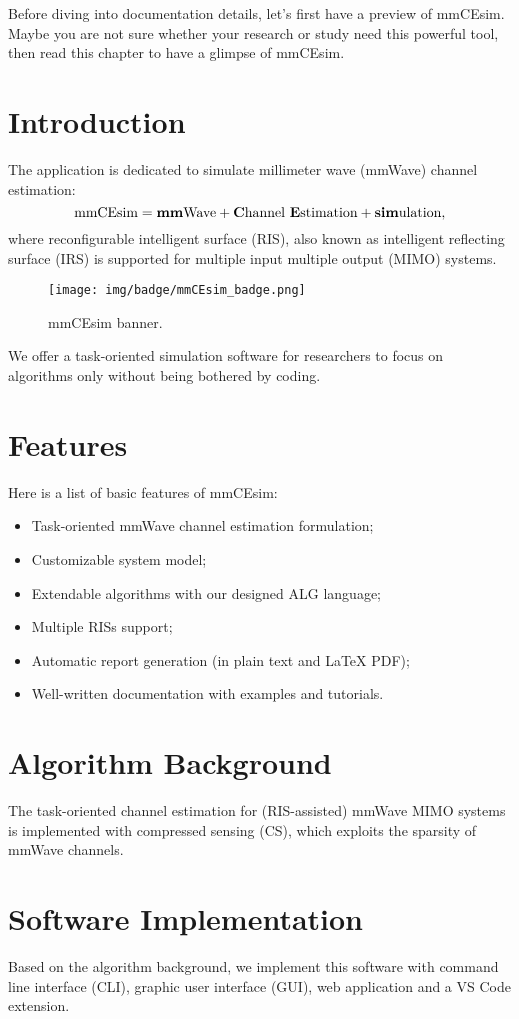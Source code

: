 Before diving into documentation details, let's first have a preview of mmCEsim.
Maybe you are not sure whether your research or study need this powerful tool,
then read this chapter to have a glimpse of mmCEsim.

\section{Introduction}

The application is dedicated to simulate
millimeter wave (mmWave) channel estimation:
\[
  \text{mmCEsim}
  =\text{\textbf{mm}Wave}
  +\text{\textbf{C}hannel \textbf{E}stimation}
  +\text{\textbf{sim}ulation},
\]
where reconfigurable intelligent surface (RIS),
also known as intelligent reflecting surface (IRS) \cite{wu2019towards} is supported
for multiple input multiple output (MIMO) systems.

\begin{figure}[htbp]
  \texttt{[image: img/badge/mmCEsim\_badge.png]}
  \caption{mmCEsim banner.}
\end{figure}

We offer a task-oriented simulation software for researchers to focus on algorithms only
without being bothered by coding.

\section{Features}

Here is a list of basic features of mmCEsim:
\begin{itemize}
  \item Task-oriented mmWave channel estimation formulation;
  \item Customizable system model;
  \item Extendable algorithms with our designed ALG language;
  \item Multiple RISs support;
  \item Automatic report generation (in plain text and \LaTeX{} PDF);
  \item Well-written documentation with examples and tutorials.
\end{itemize}

\section{Algorithm Background}

The task-oriented channel estimation for (RIS-assisted) mmWave MIMO systems
is implemented with compressed sensing (CS),
which exploits the sparsity of mmWave channels.

\section{Software Implementation}
Based on the algorithm background,
we implement this software with
command line interface (CLI),
graphic user interface (GUI),
web application and a VS Code extension.
